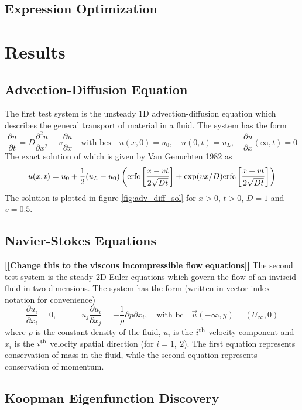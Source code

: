 \documentclass{article}
\newcommand{\todo}[1]{\textbf{[[#1]]}}
\begin{document}
\subsection{Expression Optimization}



\section{Results}
\label{results}

\subsection{Advection-Diffusion Equation}

The first test system is the unsteady 1D advection-diffusion equation which describes the general transport of material in a fluid. The system has the form
\[ \frac{\partial u}{\partial t} = D\frac{\partial^2 u}{\partial x^2} - v \frac{\partial u}{\partial x} \quad \text{with bcs} \quad u(x,0) = u_0, \quad
u(0,t) = u_L, \quad
\frac{\partial u}{\partial x}(\infty, t) = 0 \]
The exact solution of which is given by Van Genuchten 1982 as
\[ u(x,t) = u_0 + \frac{1}{2}(u_L - u_0) \left({\rm erfc}\left[ \frac{x - vt}{2\sqrt{Dt}}\right] + {\rm exp}(vx/D) {\rm erfc}\left[ \frac{x + vt}{2\sqrt{Dt}}\right] \right) \]
The solution is plotted in figure \ref{fig:adv_diff_sol} for $x>0$, $t>0$, $D=1$ and $v=0.5$.

\subsection{Navier-Stokes Equations}
\todo{Change this to the viscous incompressible flow equations}
The second test system is the steady 2D Euler equations which govern the flow of an inviscid fluid in two dimensions. The system has the form (written in vector index notation for convenience)
\[
\frac{\partial u_i}{\partial x_i} = 0, \quad \quad \quad
u_j \frac{\partial u_i}{\partial x_j} = - \frac{1}{\rho} \partial{p}{\partial x_i}, \quad \text{with bc} \quad \vec{u}(-\infty, y) = (U_\infty, 0)
\]
where $\rho$ is the constant density of the fluid, $u_i$ is the $i^{\rm th}$ velocity component and $x_i$ is the $i^{\rm th}$ velocity spatial direction (for $i=1,\ 2$).
The first equation represents conservation of mass in the fluid, while the second equation represents conservation of momentum.

\subsection{Koopman Eigenfunction Discovery}
\end{document}
